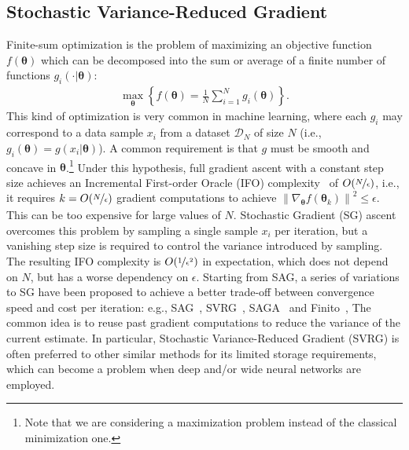 \documentclass{article}
\makeatletter
\theoremstyle{remark}
\theoremstyle{definition}
\DeclareRobustCommand{\eg}{e.g.,\@\xspace}
\DeclareRobustCommand{\ie}{i.e.,\@\xspace}
\newcommand{\todopir}[1]{\todo[color=blued, inline]{\small #1}}
\newcommand{\todopirout}[1]{\todo[color=blued]{\scriptsize #1}}
\newcommand{\norm}[2][\infty]{\left\|#2\right\|_{#1}}
\newcommand{\vtheta}{\boldsymbol{\theta}}
\makeatother
\begin{document}
\subsection{Stochastic Variance-Reduced Gradient}
Finite-sum optimization is the problem of maximizing an objective function $f(\vtheta)$ which can be decomposed into the sum or average of a finite number of functions $g_i(\cdot|\vtheta)$:
\begin{align*}
        \max_{\vtheta} \left\{ f(\vtheta) = \frac{1}{N}\sum_{i=1}^{N}g_i(\vtheta)\right\}.
\end{align*}
This kind of optimization is very common in machine learning, where each $g_i$ may correspond to a data sample $x_i$ from a dataset $\mathcal{D}_N$ of size $N$ (\ie $g_i(\vtheta) = g(x_i|\vtheta)$). 
A common requirement is that $g$ must be smooth and {\color{red} concave} in $\vtheta$.\footnote{Note that we are considering a maximization problem instead of the classical minimization one.} Under this hypothesis, full gradient ascent \cite{cauchy1847methode} with a constant step size achieves an Incremental First-order Oracle (IFO) complexity~\citep{agarwal2014lower} of $O(\nicefrac{N}{\epsilon})$, \ie it requires $k = O(\nicefrac{N}{\epsilon})$ gradient computations to achieve $\norm[]{\nabla_{\vtheta}f(\vtheta_k)}^2\leq\epsilon$.\todopirout{Is it $\ell_2$-norm?} 
This can be too expensive for large values of $N$. Stochastic Gradient (SG) ascent~\citep[\eg][]{robbins1951stochastic,bottou2004large} overcomes this problem by sampling a single sample $x_i$ per iteration, but a vanishing step size is required to control the variance introduced by sampling. The resulting IFO complexity is $O(\nicefrac{1}{\epsilon^2})$ in expectation, which does not depend on $N$, but has a worse dependency on $\epsilon$. 
\todopir{What is the reference?}
Starting from SAG, a series of variations to SG have been proposed to achieve a better trade-off between convergence speed and cost per iteration: \eg SAG~\citep{roux2012stochastic}, SVRG~\cite{johnson2013accelerating}, SAGA~\cite{defazio2014saga} and Finito~\cite{defazio2014finito}, 
The common idea is to reuse past gradient computations to reduce the variance of the current estimate.
In particular, Stochastic Variance-Reduced Gradient (SVRG) is often preferred to other similar methods for its limited storage requirements, which can become a problem when deep and/or wide neural networks are employed.  
\end{document}
